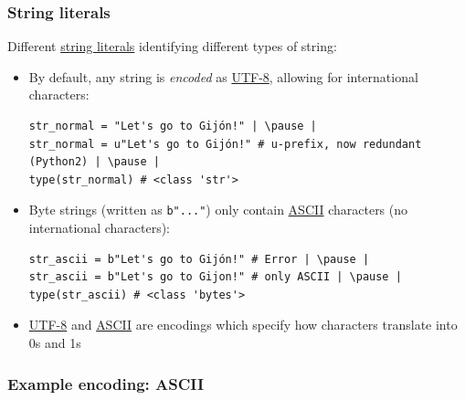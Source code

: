 \documentclass[xcolor=table]{beamer}
\begin{document}
\begin{frame}[fragile]
    \frametitle{String literals}
    Different \href{https://docs.python.org/3/reference/lexical_analysis.html#string-and-bytes-literals}{string literals} identifying different types of string:
\begin{itemize}
    \item By default, any string is \emph{encoded} as \href{https://docs.python.org/3/howto/unicode.html}{UTF-8}, allowing for international characters:
\begin{lstlisting}[style=python]
str_normal = "Let's go to Gijón!" | \pause |
str_normal = u"Let's go to Gijón!" # u-prefix, now redundant (Python2) | \pause |
type(str_normal) # <class 'str'>
\end{lstlisting}
\pause
    \item Byte strings (written as \texttt{b"..."}) only contain \href{https://en.wikipedia.org/wiki/ASCII}{ASCII} characters (no international characters):
\begin{lstlisting}[style=python]
str_ascii = b"Let's go to Gijón!" # Error | \pause |
str_ascii = b"Let's go to Gijon!" # only ASCII | \pause |
type(str_ascii) # <class 'bytes'>
\end{lstlisting}
\pause
\item \href{https://docs.python.org/3/howto/unicode.html}{UTF-8} and \href{https://en.wikipedia.org/wiki/ASCII}{ASCII} are encodings which specify how characters translate into 0s and 1s
\end{itemize}
\end{frame}
\begin{frame}[fragile]
    \frametitle{Example encoding: ASCII}
\begin{center}
\end{center}
\end{frame}
\end{document}
